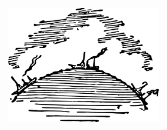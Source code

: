 \begin{center}
\includegraphics[width=0.3\textwidth]{figures/ch-06/fig-ch-06-tail.pdf}
\end{center}


















